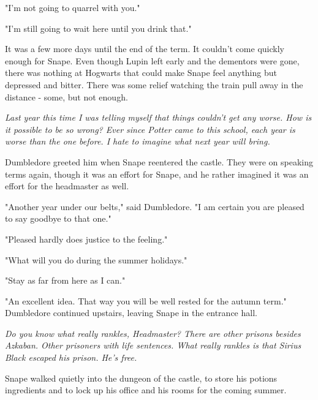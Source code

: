 "I'm not going to quarrel with you."

"I'm still going to wait here until you drink that."

\sbreak

It was a few more days until the end of the term. It couldn't come quickly enough for Snape. Even though Lupin left early and the dementors were gone, there was nothing at Hogwarts that could make Snape feel anything but depressed and bitter. There was some relief watching the train pull away in the distance - some, but not enough.

\emph{Last year this time I was telling myself that things couldn't get any worse. How is it possible to be so wrong? Ever since Potter came to this school, each year is worse than the one before. I hate to imagine what next year will bring.}

Dumbledore greeted him when Snape reentered the castle. They were on speaking terms again, though it was an effort for Snape, and he rather imagined it was an effort for the headmaster as well.

"Another year under our belts," said Dumbledore. "I am certain you are pleased to say goodbye to that one."

"Pleased hardly does justice to the feeling."

"What will you do during the summer holidays."

"Stay as far from here as I can."

"An excellent idea. That way you will be well rested for the autumn term." Dumbledore continued upstairs, leaving Snape in the entrance hall.

\emph{Do you know what really rankles, Headmaster? There are other prisons besides Azkaban. Other prisoners with life sentences. What really rankles is that Sirius Black escaped his prison. He's free.}

Snape walked quietly into the dungeon of the castle, to store his potions ingredients and to lock up his office and his rooms for the coming summer.

\sbreak 


